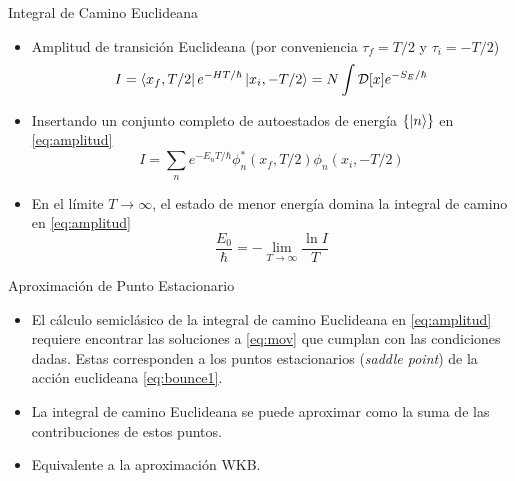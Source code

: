\documentclass{beamer}
\theoremstyle{example}
\theoremstyle{example}
\begin{document}
\begin{frame}{Integral de Camino Euclideana}
\begin{itemize}
    \item Amplitud de transición Euclideana (por conveniencia $\tau_f = T/2$ y $\tau_i = -T/2$)
    \begin{equation}\label{eq:amplitud}
        I = \bra{x_f, T/2} e^{-HT/\hbar} \ket{x_i, -T/2} = N \int \mathcal{D}[x] e^{-S_E/\hbar}
    \end{equation}
    
    \item Insertando un conjunto completo de autoestados de energía $\{ \ket{n} \}$ en \eqref{eq:amplitud}
    \begin{equation}\label{eq:Eeigen}
         I = \sum_n e^{-E_n T/\hbar} \phi^*_n(x_f, T/2) \phi_n(x_i, -T/2) 
    \end{equation}
    
    \item En el límite $T \rightarrow \infty$, el estado de menor energía domina la integral de camino en \eqref{eq:amplitud} 
    \begin{equation} \label{eq:Epi}
         \frac{E_0}{\hbar} = - \lim_{T \rightarrow \infty} \frac{\ln I}{T}
    \end{equation}
\end{itemize}
\end{frame}

\begin{frame}{Aproximación de Punto Estacionario}
\begin{itemize}
    \item El cálculo semiclásico de la integral de camino Euclideana en \eqref{eq:amplitud} requiere encontrar las soluciones a \eqref{eq:mov} que cumplan con las condiciones dadas. Estas corresponden a los puntos estacionarios (\emph{saddle point}) de la acción euclideana \eqref{eq:bounce1}.
    
    \item La integral de camino Euclideana se puede aproximar como la suma de las contribuciones de estos puntos.
    
    \item Equivalente a la aproximación WKB.
\end{itemize}
\end{frame}
\end{document}
